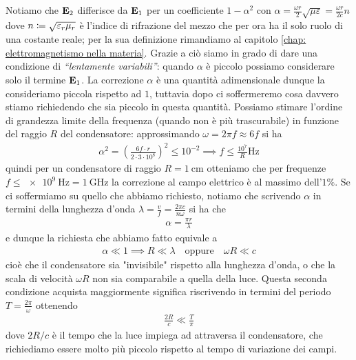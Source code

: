 


Notiamo che $ \mathbf{ E }_2 $ differisce da $ \mathbf{ E }_1 $ per un coefficiente 
$ 1 - \alpha^2 $ con $\displaystyle \alpha = \frac{\omega r}{2} \sqrt{\mu \varepsilon} = \frac{\omega r}{2 c} n $ dove $ n \coloneq \sqrt{\varepsilon_r \mu_r}$ 
è l'indice di rifrazione del mezzo che per ora ha il solo ruolo di una costante reale; per la sua definizione rimandiamo al capitolo 
\ref{chap: elettromagnetismo nella materia}. Grazie a ciò siamo in grado di dare una condizione di 
\textit{\enquote{lentamente variabili}}: quando $ \alpha $ è piccolo possiamo considerare solo il termine $ \mathbf{ E }_1 $. La correzione $ \alpha $ è una 
quantità adimensionale dunque la consideriamo piccola rispetto ad $ 1 $, tuttavia dopo ci soffermeremo cosa davvero stiamo richiedendo che sia piccolo 
in questa quantità. Possiamo stimare l'ordine di grandezza limite della frequenza (quando non è più trascurabile) in funzione del raggio $ R $ del 
condensatore: approssimando $ \omega = 2 \pi f \approx 6 f $ si ha
\begin{align}
  \alpha^2 = \left( \frac{ 6 f \cdot r }{2 \cdot 3 \cdot 10^8} \right)^2 \leq 10^{-2} \implies f \leq \frac{10^7}{R} \si{\Hz}
\end{align}
quindi per un condensatore di raggio $ R = \SI{1}{\cm} $ otteniamo che per frequenze $ f \leq \SI{e9}{\Hz} = \SI{1}{\GHz} $ la correzione al campo elettrico 
è al massimo dell'$ 1\% $. Se ci soffermiamo su quello che abbiamo richiesto, notiamo che scrivendo $ \alpha $ in termini della lunghezza d'onda 
$ \lambda = \frac{v}{f} = \frac{2\pi c}{n\omega} $ si ha che 
\begin{align}
  \alpha = \frac{\pi r}{\lambda} 
\end{align}
e dunque la richiesta che abbiamo fatto equivale a 
\begin{align}
  \alpha \ll 1 \implies R \ll \lambda \quad \text{oppure} \quad \omega R \ll c
\end{align}
cioè che il condensatore sia "invisibile" rispetto alla lunghezza d'onda, o che la scala di velocità $ \omega R $ non sia comparabile a quella della luce. 
Questa seconda condizione acquista maggiormente significa riscrivendo in termini del periodo $ T = \frac{2\pi}{\omega} $ ottenendo
\begin{align}
  \frac{2R}{c} \ll \frac{T}{\pi}
\end{align}
dove $ 2R/c $ è il tempo che la luce impiega ad attraversa il condensatore, che richiediamo essere molto più piccolo rispetto al tempo di variazione 
dei campi.

